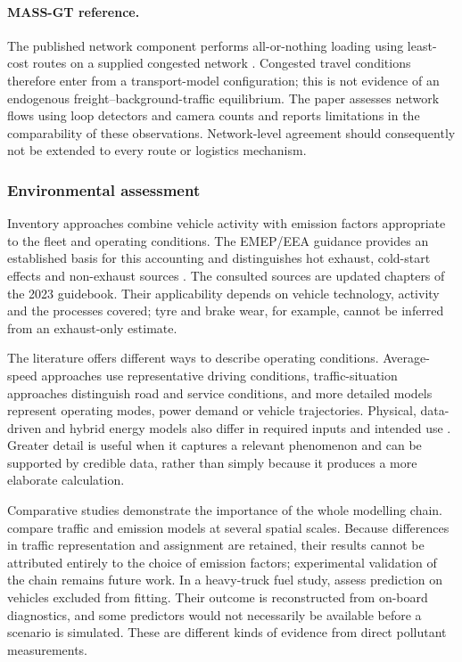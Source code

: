 \paragraph{MASS-GT reference.}
The published network component performs all-or-nothing loading using
least-cost routes on a supplied congested network \parencite{massgt2025}.
Congested travel conditions therefore enter from a transport-model configuration;
this is not evidence of an endogenous freight--background-traffic equilibrium.
The paper assesses network flows using loop detectors and camera counts and
reports limitations in the comparability of these observations. Network-level
agreement should consequently not be extended to every route or logistics
mechanism.

\subsubsection{Environmental assessment}\label{sec:f7}
Inventory approaches combine vehicle activity with emission factors appropriate
to the fleet and operating conditions. The EMEP/EEA guidance provides an
established basis for this accounting and distinguishes hot exhaust,
cold-start effects and non-exhaust sources
\parencite{eeaRoad2026,eeaWear2026}. The consulted sources are updated chapters of
the 2023 guidebook. Their applicability depends on vehicle technology, activity
and the processes covered; tyre and brake wear, for example, cannot be inferred
from an exhaust-only estimate.

The literature offers different ways to describe operating conditions.
Average-speed approaches use representative driving conditions, traffic-situation
approaches distinguish road and service conditions, and more detailed models
represent operating modes, power demand or vehicle trajectories. Physical,
data-driven and hybrid energy models also differ in required inputs and intended
use \parencite{hua2025}. Greater detail is useful when it captures a relevant
phenomenon and can be supported by credible data, rather than simply because it
produces a more elaborate calculation.

Comparative studies demonstrate the importance of the whole modelling chain.
\Textcite{tirico2025} compare traffic and emission models at several spatial
scales. Because differences in traffic representation and assignment are
retained, their results cannot be attributed entirely to the choice of emission
factors; experimental validation of the chain remains future work. In a
heavy-truck fuel study, \textcite{wang2026} assess prediction on vehicles excluded
from fitting. Their outcome is reconstructed from on-board diagnostics, and some
predictors would not necessarily be available before a scenario is simulated.
These are different kinds of evidence from direct pollutant measurements.

